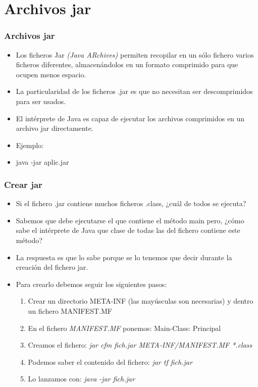 \documentclass{beamer}
\begin{document}
\section{Archivos jar}
\begin{frame}
\frametitle{Archivos jar}
\begin{itemize}[<+->]
\item Los ficheros Jar \emph{(Java ARchives)} permiten recopilar en un sólo fichero varios ficheros diferentes, almacenándolos en un formato comprimido para que ocupen menos espacio.
\item La particularidad de los ficheros .jar es que no necesitan ser descomprimidos para ser usados.
\item El intérprete de Java es capaz de ejecutar los archivos comprimidos en un archivo jar directamente. 
\item Ejemplo:
\item \alert{java -jar aplic.jar}
\end{itemize}
\pause
\end{frame}

\begin{frame}
\frametitle{Crear jar}
\begin{itemize}[<+->]
\item Si el fichero .jar contiene muchos ficheros .class, ¿cuál de todos se ejecuta?
\item Sabemos que debe ejecutarse el que contiene el método main pero, ¿cómo sabe el intérprete de Java que clase de todas las del fichero contiene este método?
\item La respuesta es que lo sabe porque se lo tenemos que decir durante la creación del fichero jar.  
\item Para crearlo debemos seguir los siguientes pasos:
\begin{enumerate}
\item Crear un directorio META-INF (las mayúsculas son necesarias) y dentro un fichero MANIFEST.MF
\item En el fichero \emph{MANIFEST.MF} ponemos: Main-Class: Principal
\item Creamos el fichero: \alert{\emph{jar cfm fich.jar META-INF/MANIFEST.MF *.class}}
\item Podemos saber el contenido del fichero: \alert{\emph{jar tf fich.jar}}
\item Lo lanzamos con: \alert{\emph{java -jar fich.jar }}
\end{enumerate}

\end{itemize}
\pause
\end{frame}
\end{document}
